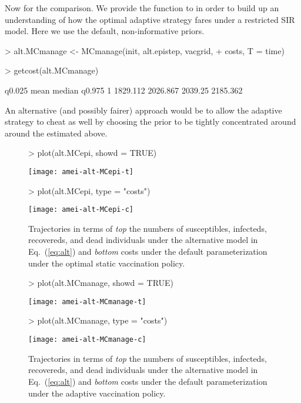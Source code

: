 \documentclass[shortnames,nojss]{jss}
\begin{document}
Now for the comparison. We provide the  function to
 in order to build up an understanding of how the
optimal adaptive strategy fares under a restricted SIR model. Here we
use the default, non-informative priors.
\begin{Schunk}
\begin{Sinput}
> alt.MCmanage <- MCmanage(init, alt.epistep, vacgrid, 
+     costs, T = time)
\end{Sinput}
\end{Schunk}
\begin{Schunk}
\begin{Sinput}
> getcost(alt.MCmanage)
\end{Sinput}
\begin{Soutput}
    q0.025     mean  median   q0.975
1 1829.112 2026.867 2039.25 2185.362
\end{Soutput}
\end{Schunk}
An alternative (and possibly fairer) approach would be to allow the
adaptive strategy to cheat as well by choosing the prior to be tightly
concentrated around around the  estimated above.
\begin{figure}[ht!]
\begin{Schunk}
\begin{Sinput}
> plot(alt.MCepi, showd = TRUE)
\end{Sinput}
\end{Schunk}
\centering
\texttt{[image: amei-alt-MCepi-t]} 
\begin{Schunk}
\begin{Sinput}
> plot(alt.MCepi, type = "costs")
\end{Sinput}
\end{Schunk}
\centering
\texttt{[image: amei-alt-MCepi-c]}
\caption{Trajectories in terms of {\em top} the numbers of susceptibles,
  infecteds, recovereds, and dead individuals under the alternative
  model in Eq.~(\ref{eq:alt}) and {\em bottom} costs under the default 
parameterization under the optimal static vaccination policy.}
\label{f:alt-MCepi}
\end{figure} 
\begin{figure}[ht!]
\begin{Schunk}
\begin{Sinput}
> plot(alt.MCmanage, showd = TRUE)
\end{Sinput}
\end{Schunk}
\centering
\texttt{[image: amei-alt-MCmanage-t]} 
\begin{Schunk}
\begin{Sinput}
> plot(alt.MCmanage, type = "costs")
\end{Sinput}
\end{Schunk}
\centering
\texttt{[image: amei-alt-MCmanage-c]}
\caption{Trajectories in terms of {\em top} the numbers of susceptibles,
  infecteds, recovereds, and dead individuals under the alternative
  model in Eq.~(\ref{eq:alt}) and {\em bottom} costs under the default parameterization under the adaptive vaccination policy.}
\label{f:alt-MCmanage}
\end{figure} 
\end{document}
